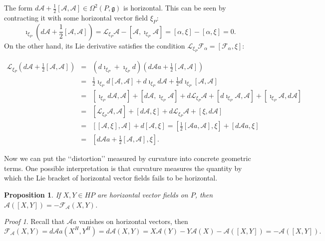 \documentclass[11pt]{report}
\theoremstyle{plain}
\newtheorem{prop}[thm]{Proposition}
\theoremstyle{definition}
\theoremstyle{remark}
\theoremstyle{remark}
\newtheorem*{pr}{Proof}
\numberwithin{equation}{section}
\begin{document}
The form $d\mathcal{A} +\frac{1}{2}[\mathcal{A}, \mathcal{A}]\in \Omega^2(P,\mathfrak{g})$ is horizontal. This can be seen by contracting it with some horizontal vector field $\xi_P$:
$$\imath_{\xi_P}(d\mathcal{A} +\frac{1}{2}[\mathcal{A}, \mathcal{A}]) = \mathcal{L}_{\xi_P}\mathcal{A} - [\mathcal{A}, \imath_{\xi_P}\mathcal{A}]= [\alpha, \xi]-[\alpha, \xi]=0.$$
On the other hand, its Lie derivative satisfies the condition $\mathcal{L}_{\xi_P}\mathcal{F}_{\alpha} = [\mathcal{F}_{\alpha},\xi]$:


\begin{spacing}{1.45}
$\begin{array}{lcl}
\mathcal{L}_{\xi_P}(d\mathcal{A} +\frac{1}{2}[\mathcal{A}, \mathcal{A}]) &=& (d\imath_{\xi_P} + \imath_{\xi_P}d)(d\mathcal{A}a +\frac{1}{2}[\mathcal{A}, \mathcal{A}]) \\
&=& \frac{1}{2}\imath_{\xi_P}d[\mathcal{A}, \mathcal{A}] + d\imath_{\xi_P}d\mathcal{A} + \frac{1}{2}d\imath_{\xi_P}[\mathcal{A}, \mathcal{A}]\\
&=& [\imath_{\xi_P}d\mathcal{A}, \mathcal{A}] +[d\mathcal{A}, \imath_{\xi_P}\mathcal{A}] + d\mathcal{L}_{\xi_P}\mathcal{A} +[d\imath_{\xi_P}\mathcal{A}, \mathcal{A}] + [\imath_{\xi_P}\mathcal{A}, d\mathcal{A}]\\
&=& [\mathcal{L}_{\xi_P}\mathcal{A}, \mathcal{A}] + [d\mathcal{A}, \xi] + d\mathcal{L}_{\xi_P}\mathcal{A} + [\xi, d\mathcal{A}]\\
&=& [[\mathcal{A},\xi], \mathcal{A}] + d [\mathcal{A}, \xi] = [\frac{1}{2}[\mathcal{A}a, \mathcal{A}], \xi] + [d\mathcal{A}a, \xi] \\
&=& [d\mathcal{A}a + \frac{1}{2}[\mathcal{A}, \mathcal{A}], \xi].
 
 \end{array}$
 \end{spacing}


Now we can put the \lq\lq{}distortion\rq\rq{} measured by curvature into concrete geometric terms. 
One possible interpretation is that curvature measures the quantity by which the Lie bracket of horizontal vector fields fails to be horizontal. 
\begin{prop}
If $X,Y\in HP$ are horizontal vector fields on $P$, then 
$\mathcal{A} ([X,Y]) = - \mathcal{F}_{\mathcal{A}}(X,Y)$.
\end{prop}

\begin{pr}
Recall that $\mathcal{A}a$ vanishes on horizontal vectors, then
$$ 
\mathcal{F}_{\mathcal{A}}(X,Y) = d \mathcal{A}a (X^H,Y^H) = d \mathcal{A} (X,Y) = X\mathcal{A}(Y) - Y\mathcal{A}(X) - \mathcal{A} ([X,Y]) = - \mathcal{A} ([X,Y]).$$
\end{pr}
\end{document}
